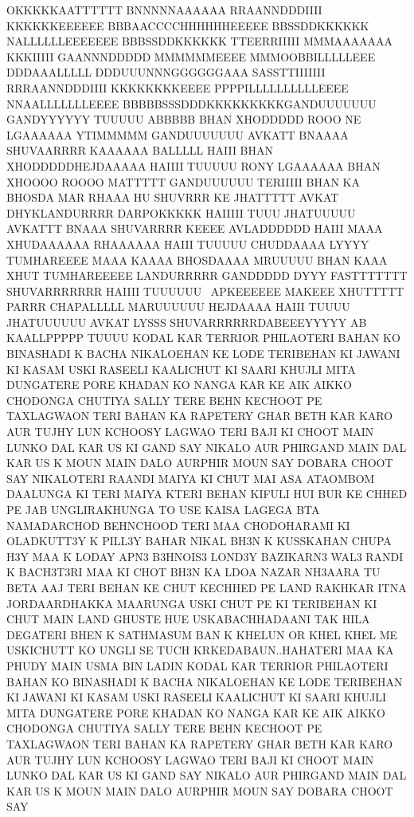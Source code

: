 OKKKKKAATTTTTT BNNNNNAAAAAA RRAANNDDDIIII KKKKKKEEEEEE
BBBAACCCCHHHHHHEEEEE BBSSDDKKKKKK NALLLLLLEEEEEEE
BBBSSDDKKKKKK TTEERRIIIII MMMAAAAAAA KKKIIIII GAANNNDDDDD
MMMMMMEEEE MMMOOBBILLLLLEEE DDDAAALLLLL DDDUUUNNNGGGGGGAAA 
SASSTTIIIIIII RRRAANNDDDIIII KKKKKKKKEEEE PPPPILLLLLLLLLLEEEE NNAALLLLLLLEEEE 
BBBBBSSSDDDKKKKKKKKKGANDUUUUUUU GANDYYYYYY 
TUUUUU ABBBBB BHAN XHODDDDD ROOO NE LGAAAAAA YTIMMMMM GANDUUUUUUU 
AVKATT BNAAAA SHUVAARRRR KAAAAAA BALLLLL HAIII BHAN 
XHODDDDDHEJDAAAAA HAIIII TUUUUU RONY LGAAAAAA BHAN XHOOOO ROOOO MATTTTT
GANDUUUUUU TERIIIII BHAN KA 
BHOSDA MAR RHAAA HU SHUVRRR KE JHATTTTT AVKAT DHYKLANDURRRR 
DARPOKKKKK HAIIIII TUUU JHATUUUUU AVKATTT BNAAA SHUVARRRR KEEEE AVLADDDDDD HAIII 
MAAA XHUDAAAAAA RHAAAAAA HAIII TUUUUU CHUDDAAAA LYYYY TUMHAREEEE MAAA KAAAA
BHOSDAAAA MRUUUUU
BHAN KAAA XHUT TUMHAREEEEE LANDURRRRR GANDDDDD DYYY FASTTTTTTT SHUVARRRRRRR 
HAIIII TUUUUUU  APKEEEEEE MAKEEE XHUTTTTT 
PARRR CHAPALLLLL MARUUUUUU HEJDAAAA HAIII TUUUU JHATUUUUUU AVKAT LYSSS 
SHUVARRRRRRDABEEEYYYYY AB KAALLPPPPP TUUUU 
KODAL KAR TERRIOR PHILAOTERI BAHAN KO
BINASHADI K BACHA NIKALOEHAN KE LODE
TERIBEHAN KI JAWANI KI KASAM USKI RASEELI
KAALICHUT KI SAARI KHUJLI MITA DUNGATERE
PORE KHADAN KO NANGA KAR KE AIK AIKKO
CHODONGA CHUTIYA SALLY TERE BEHN
KECHOOT PE TAXLAGWAON TERI BAHAN KA
RAPETERY GHAR BETH KAR KARO AUR TUJHY
LUN KCHOOSY LAGWAO TERI BAJI KI CHOOT
MAIN LUNKO DAL KAR US KI GAND SAY NIKALO
AUR PHIRGAND MAIN DAL KAR US K MOUN
MAIN DALO AURPHIR MOUN SAY DOBARA
CHOOT SAY NIKALOTERI RAANDI MAIYA KI CHUT
MAI ASA ATAOMBOM DAALUNGA KI TERI MAIYA
KTERI BEHAN KIFULI HUI BUR KE CHHED PE JAB
UNGLIRAKHUNGA TO USE KAISA LAGEGA BTA
NAMADARCHOD BEHNCHOOD TERI MAA
CHODOHARAMI KI OLADKUTT3Y K PILL3Y
BAHAR NIKAL BH3N K KUSSKAHAN CHUPA H3Y
MAA K LODAY APN3 B3HNOIS3 LOND3Y
BAZIKARN3 WAL3 RANDI K BACH3T3RI MAA KI
CHOT BH3N KA LDOA NAZAR NH3AARA TU BETA
AAJ TERI BEHAN KE CHUT KECHHED PE LAND
RAKHKAR ITNA JORDAARDHAKKA MAARUNGA
USKI CHUT PE KI TERIBEHAN KI CHUT MAIN
LAND GHUSTE HUE USKABACHHADAANI TAK
HILA DEGATERI BHEN K SATHMASUM BAN K
KHELUN OR KHEL KHEL ME USKICHUTT KO
UNGLI SE TUCH KRKEDABAUN..HAHATERI MAA
KA PHUDY MAIN USMA BIN LADIN KODAL KAR
TERRIOR PHILAOTERI BAHAN KO BINASHADI K
BACHA NIKALOEHAN KE LODE TERIBEHAN KI
JAWANI KI KASAM USKI RASEELI KAALICHUT KI
SAARI KHUJLI MITA DUNGATERE PORE KHADAN
KO NANGA KAR KE AIK AIKKO CHODONGA
CHUTIYA SALLY TERE BEHN KECHOOT PE
TAXLAGWAON TERI BAHAN KA RAPETERY GHAR
BETH KAR KARO AUR TUJHY LUN KCHOOSY
LAGWAO TERI BAJI KI CHOOT MAIN LUNKO DAL
KAR US KI GAND SAY NIKALO AUR PHIRGAND
MAIN DAL KAR US K MOUN MAIN DALO
AURPHIR MOUN SAY DOBARA CHOOT SAY
